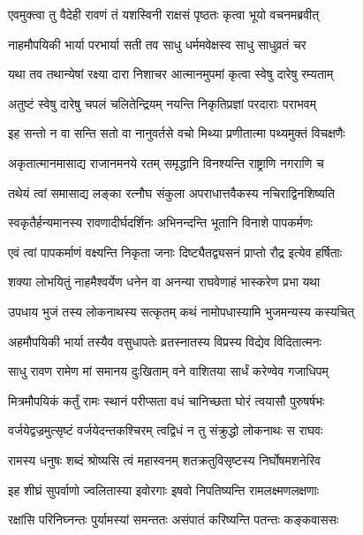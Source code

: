 \twolineshloka
{एवमुक्त्वा तु वैदेही रावणं तं यशस्विनी}
{राक्षसं पृष्ठतः कृत्वा भूयो वचनमब्रवीत्} %

\twolineshloka
{नाहमौपयिकी भार्या परभार्या सती तव}
{साधु धर्ममवेक्षस्व साधु साधुव्रतं चर} %

\twolineshloka
{यथा तव तथान्येषां रक्ष्या दारा निशाचर}
{आत्मानमुपमां कृत्वा स्वेषु दारेषु रम्यताम्} %

\twolineshloka
{अतुष्टं स्वेषु दारेषु चपलं चलितेन्द्रियम्}
{नयन्ति निकृतिप्रज्ञां परदाराः पराभवम्} %

\twolineshloka
{इह सन्तो न वा सन्ति सतो वा नानुवर्तसे}
{वचो मिथ्या प्रणीतात्मा पथ्यमुक्तं विचक्षणैः} %

\twolineshloka
{अकृतात्मानमासाद्य राजानमनये रतम्}
{समृद्धानि विनश्यन्ति राष्ट्राणि नगराणि च} %

\twolineshloka
{तथेयं त्वां समासाद्य लङ्का रत्नौघ संकुला}
{अपराधात्तवैकस्य नचिराद्विनशिष्यति} %

\twolineshloka
{स्वकृतैर्हन्यमानस्य रावणादीर्घदर्शिनः}
{अभिनन्दन्ति भूतानि विनाशे पापकर्मणः} %

\twolineshloka
{एवं त्वां पापकर्माणं वक्ष्यन्ति निकृता जनाः}
{दिष्ट्यैतद्व्यसनं प्राप्तो रौद्र इत्येव हर्षिताः} %

\twolineshloka
{शक्या लोभयितुं नाहमैश्वर्येण धनेन वा}
{अनन्या राघवेणाहं भास्करेण प्रभा यथा} %

\twolineshloka
{उपधाय भुजं तस्य लोकनाथस्य सत्कृतम्}
{कथं नामोपधास्यामि भुजमन्यस्य कस्यचित्} %

\twolineshloka
{अहमौपयिकी भार्या तस्यैव वसुधापतेः}
{व्रतस्नातस्य विप्रस्य विद्येव विदितात्मनः} %

\twolineshloka
{साधु रावण रामेण मां समानय दुःखिताम्}
{वने वाशितया सार्धं करेण्वेव गजाधिपम्} %

\twolineshloka
{मित्रमौपयिकं कर्तुं रामः स्थानं परीप्सता}
{वधं चानिच्छता घोरं त्वयासौ पुरुषर्षभः} %

\twolineshloka
{वर्जयेद्वज्रमुत्सृष्टं वर्जयेदन्तकश्चिरम्}
{त्वद्विधं न तु संक्रुद्धो लोकनाथः स राघवः} %

\twolineshloka
{रामस्य धनुषः शब्दं श्रोष्यसि त्वं महास्वनम्}
{शतक्रतुविसृष्टस्य निर्घोषमशनेरिव} %

\twolineshloka
{इह शीघ्रं सुपर्वाणो ज्वलितास्या इवोरगाः}
{इषवो निपतिष्यन्ति रामलक्ष्मणलक्षणाः} %

\twolineshloka
{रक्षांसि परिनिघ्नन्तः पुर्यामस्यां समन्ततः}
{असंपातं करिष्यन्ति पतन्तः कङ्कवाससः} %

